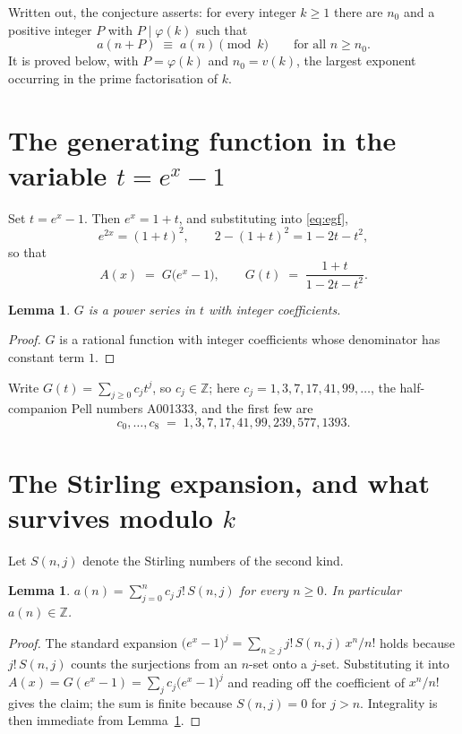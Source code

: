 \documentclass[11pt,a4paper]{article}
\theoremstyle{plain}
\newtheorem{lemma}[theorem]{Lemma}
\theoremstyle{definition}
\begin{document}
Written out, the conjecture asserts: for every integer $k\ge 1$ there are $n_0$ and a
positive integer $P$ with $P\mid\varphi(k)$ such that
\begin{equation}\label{eq:conj}
a(n+P)\;\equiv\;a(n)\pmod{k}\qquad\text{for all } n\ge n_0 .
\end{equation}
It is proved below, with $P=\varphi(k)$ and $n_0=v(k)$, the largest exponent occurring in
the prime factorisation of $k$.

\section{The generating function in the variable $t=e^{x}-1$}

Set $t=e^{x}-1$. Then $e^{x}=1+t$, and substituting into \eqref{eq:egf},
\[
e^{2x}=(1+t)^{2},\qquad 2-(1+t)^{2}=1-2t-t^{2},
\]
so that
\begin{equation}\label{eq:G}
A(x)\;=\;G\bigl(e^{x}-1\bigr),\qquad
G(t)\;=\;\frac{1+t}{1-2t-t^{2}}.
\end{equation}

\begin{lemma}\label{lem:int}
$G$ is a power series in $t$ with integer coefficients.
\end{lemma}

\begin{proof}
$G$ is a rational function with integer coefficients whose denominator has constant term $1$.
\end{proof}

Write $G(t)=\sum_{j\ge0}c_j t^{j}$, so $c_j\in\mathbb{Z}$; here $c_j = 1, 3, 7, 17, 41, 99, \dots$, the half-companion Pell numbers A001333, and the
first few are
\[
c_0,\dots,c_8 \;=\; 1, 3, 7, 17, 41, 99, 239, 577, 1393.
\]

\section{The Stirling expansion, and what survives modulo $k$}

Let $S(n,j)$ denote the Stirling numbers of the second kind.

\begin{lemma}\label{lem:stir}
$a(n)=\sum_{j=0}^{n} c_j\, j!\, S(n,j)$ for every $n\ge 0$. In particular $a(n)\in\mathbb{Z}$.
\end{lemma}

\begin{proof}
The standard expansion $\bigl(e^{x}-1\bigr)^{j}
=\sum_{n\ge j} j!\,S(n,j)\,x^{n}/n!$ holds because $j!\,S(n,j)$ counts the surjections
from an $n$-set onto a $j$-set. Substituting it into
$A(x)=G(e^{x}-1)=\sum_j c_j\bigl(e^{x}-1\bigr)^{j}$ and reading off the coefficient of
$x^{n}/n!$ gives the claim; the sum is finite because $S(n,j)=0$ for $j>n$. Integrality is
then immediate from Lemma~\ref{lem:int}.
\end{proof}
\end{document}
